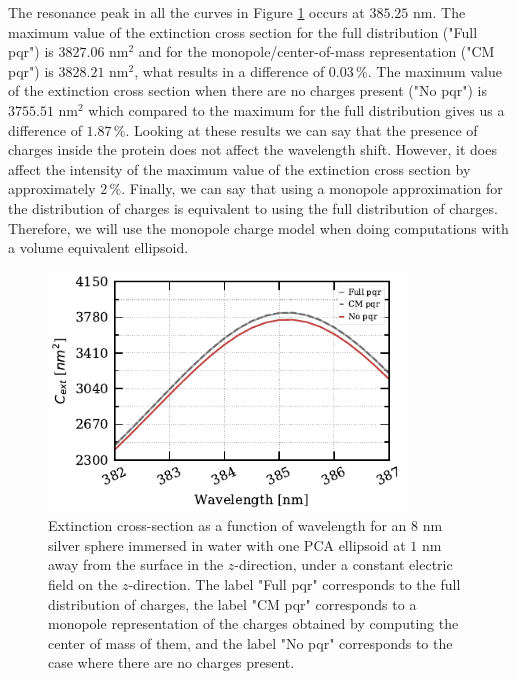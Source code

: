  The resonance peak in all the curves in Figure \ref{fig:pqr_pca} occurs at $385.25$ nm. The 
 maximum value of the extinction cross section for the full distribution ("Full pqr") is $3827.06$ nm$^2$ and for 
 the monopole/center-of-mass representation ("CM pqr") is $3828.21$ nm$^2$, what results in a difference of $0.03 \,\%$. The
 maximum value of the extinction cross section when there are no charges present ("No pqr") is $3755.51$ nm$^2$ which compared to 
 the maximum for the full distribution gives us a difference of $1.87 \,\%$. Looking at these results we can say that the presence of 
 charges inside the protein does not affect the wavelength shift. However, it does affect the intensity of the maximum value of the 
 extinction cross section by approximately $2 \,\%$. Finally, we can say that using a monopole approximation for the distribution of charges 
 is equivalent to using the full distribution of charges. Therefore, we will use the monopole charge model when doing computations with 
 a volume equivalent ellipsoid. 

\begin{figure}%
    \centering
    \includegraphics[width=0.85\textwidth]{pqr_analysis_pca.pdf} 
    \caption{Extinction cross-section as a function of wavelength for an $8$ nm
    silver sphere immersed in water with one PCA ellipsoid at $1$ nm away from 
    the surface in the $z$-direction, under a constant electric field on the $z$-direction.
    The label "Full pqr" corresponds to the full distribution of charges, the label "CM pqr" corresponds to a monopole representation 
    of the charges obtained by computing the center of mass of them, and the label "No pqr" 
    corresponds to the case where there are no charges present.}
    \label{fig:pqr_pca}
 \end{figure}



